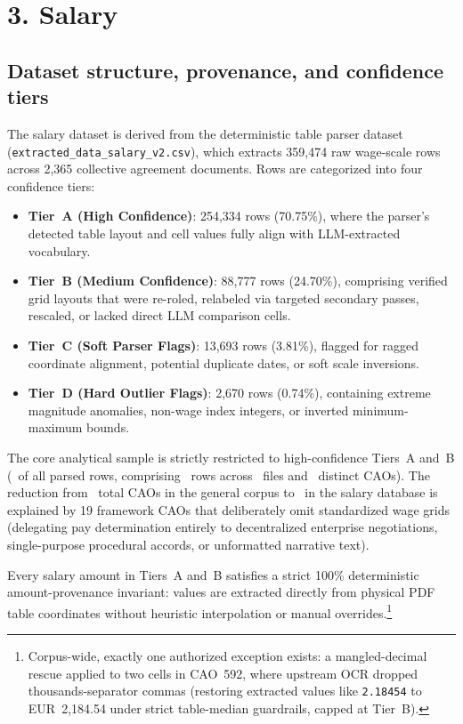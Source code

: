 \section*{3. Salary}
\label{sec:salary}

\subsection*{Dataset structure, provenance, and confidence tiers}

The salary dataset is derived from the deterministic table parser dataset (\texttt{extracted\_data\_salary\_v2.csv}), which extracts 359,474 raw wage-scale rows across 2,365 collective agreement documents. Rows are categorized into four confidence tiers:
\begin{itemize}
    \item \textbf{Tier~A (High Confidence)}: 254,334 rows (70.75\%), where the parser's detected table layout and cell values fully align with LLM-extracted vocabulary.
    \item \textbf{Tier~B (Medium Confidence)}: 88,777 rows (24.70\%), comprising verified grid layouts that were re-roled, relabeled via targeted secondary passes, rescaled, or lacked direct LLM comparison cells.
    \item \textbf{Tier~C (Soft Parser Flags)}: 13,693 rows (3.81\%), flagged for ragged coordinate alignment, potential duplicate dates, or soft scale inversions.
    \item \textbf{Tier~D (Hard Outlier Flags)}: 2,670 rows (0.74\%), containing extreme magnitude anomalies, non-wage index integers, or inverted minimum-maximum bounds.
\end{itemize}

The core analytical sample is strictly restricted to high-confidence Tiers~A and~B (\SalTierABShare\ of all parsed rows, comprising \SalTotalRows\ rows across \SalUniqueFiles\ files and \SalUniqueCAOs\ distinct CAOs). The reduction from \GenUniqueCAOs\ total CAOs in the general corpus to \SalUniqueCAOs\ in the salary database is explained by 19 framework CAOs that deliberately omit standardized wage grids (delegating pay determination entirely to decentralized enterprise negotiations, single-purpose procedural accords, or unformatted narrative text).

Every salary amount in Tiers~A and~B satisfies a strict 100\% deterministic amount-provenance invariant: values are extracted directly from physical PDF table coordinates without heuristic interpolation or manual overrides.\footnote{Corpus-wide, exactly one authorized exception exists: a mangled-decimal rescue applied to two cells in CAO~592, where upstream OCR dropped thousands-separator commas (restoring extracted values like \texttt{2.18454} to EUR~2,184.54 under strict table-median guardrails, capped at Tier~B).}


